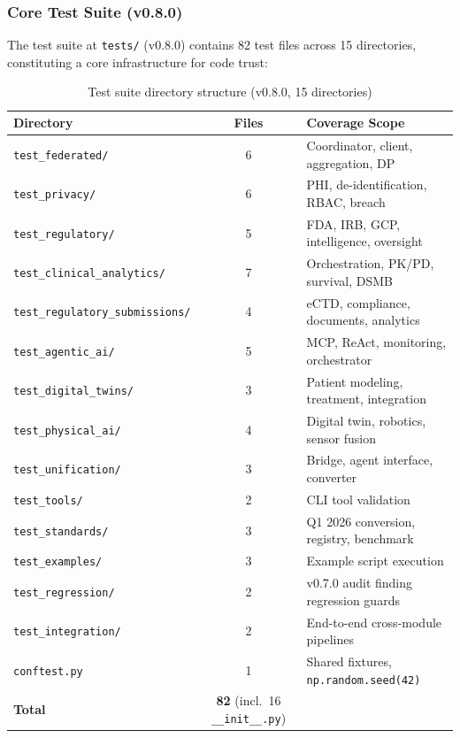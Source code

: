 \subsubsection{Core Test Suite (v0.8.0)}

The test suite at \texttt{tests/} (v0.8.0) contains 82 test files across 15 directories, constituting a core infrastructure for code trust:

\begin{table}[H]
\centering
\caption{Test suite directory structure (v0.8.0, 15 directories)}
\label{tab:tests}
\small
\begin{tabular}{@{}lcp{4.5cm}@{}}
\toprule
\textbf{Directory} & \textbf{Files} & \textbf{Coverage Scope} \\
\midrule
\texttt{test\_federated/} & 6 & Coordinator, client, aggregation, DP \\
\texttt{test\_privacy/} & 6 & PHI, de-identification, RBAC, breach \\
\texttt{test\_regulatory/} & 5 & FDA, IRB, GCP, intelligence, oversight \\
\texttt{test\_clinical\_analytics/} & 7 & Orchestration, PK/PD, survival, DSMB \\
\texttt{test\_regulatory\_submissions/} & 4 & eCTD, compliance, documents, analytics \\
\texttt{test\_agentic\_ai/} & 5 & MCP, ReAct, monitoring, orchestrator \\
\texttt{test\_digital\_twins/} & 3 & Patient modeling, treatment, integration \\
\texttt{test\_physical\_ai/} & 4 & Digital twin, robotics, sensor fusion \\
\texttt{test\_unification/} & 3 & Bridge, agent interface, converter \\
\texttt{test\_tools/} & 2 & CLI tool validation \\
\texttt{test\_standards/} & 3 & Q1 2026 conversion, registry, benchmark \\
\texttt{test\_examples/} & 3 & Example script execution \\
\texttt{test\_regression/} & 2 & v0.7.0 audit finding regression guards \\
\texttt{test\_integration/} & 2 & End-to-end cross-module pipelines \\
\texttt{conftest.py} & 1 & Shared fixtures, \texttt{np.random.seed(42)} \\
\midrule
\textbf{Total} & \textbf{82} (incl.\ 16 \texttt{\_\_init\_\_.py}) & \\
\bottomrule
\end{tabular}
\end{table}

